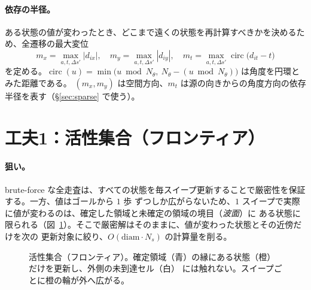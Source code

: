 \documentclass[11pt]{ltjsarticle}
\newcommand{\circd}{\operatorname{circ}}
\begin{document}
\paragraph{依存の半径。}
ある状態の値が変わったとき、どこまで遠くの状態を再計算すべきかを決めるため、全遷移の最大変位
\begin{equation}
m_x=\max_{a,t,\Delta s'}|d_{ix}|,\quad
m_y=\max_{a,t,\Delta s'}|d_{iy}|,\quad
m_t=\max_{a,t,\Delta s'}\circd\!\big(d_{it}-t\big)
\label{eq:disp}
\end{equation}
を定める。$\circd(u)=\min\big(u\bmod N_\theta,\ N_\theta-(u\bmod N_\theta)\big)$ は角度を円環とみた距離である。
$(m_x,m_y)$ は空間方向、$m_t$ は源の向きからの角度方向の依存半径を表す（\S\ref{sec:sparse} で使う）。

\section{工夫1：活性集合（フロンティア）}
\label{sec:frontier}

\paragraph{狙い。}
brute-force な全走査は、すべての状態を毎スイープ更新することで厳密性を保証する。一方、値はゴールから $1$ 歩
ずつしか広がらないため、$1$ スイープで実際に値が変わるのは、確定した領域と未確定の領域の境目（\emph{波面}）に
ある状態に限られる（図~\ref{fig:frontier}）。そこで厳密解はそのままに、値が変わった状態とその近傍だけを次の
更新対象に絞り、$O(\mathrm{diam}\cdot N_s)$ の計算量を削る。

\begin{figure}[h]
\centering
{}
\caption{活性集合（フロンティア）。確定領域（青）の縁にある状態（橙）だけを更新し、外側の未到達セル（白）
には触れない。スイープごとに橙の輪が外へ広がる。}
\label{fig:frontier}
\end{figure}
\end{document}
